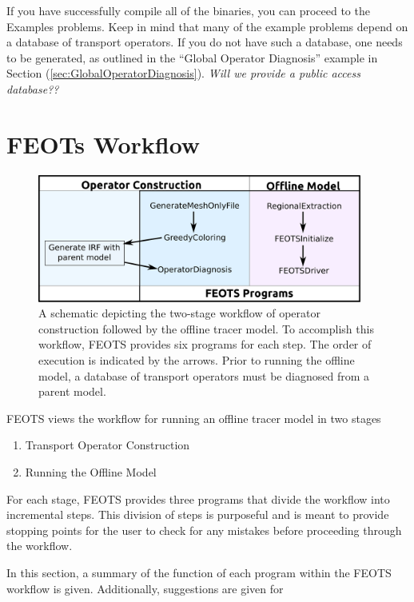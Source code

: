 \documentclass{softwaremanual}
\begin{document}
If you have successfully compile all of the binaries, you can proceed to the Examples problems. Keep in mind that many of the example problems depend on a database of transport operators. If you do not have such a database, one needs to be generated, as outlined in the ``Global Operator Diagnosis'' example in Section (\ref{sec:GlobalOperatorDiagnosis}). \textit{Will we provide a public access database??}

\chapter{FEOTs Workflow}
\begin{figure}[h!]
\begin{center}
\includegraphics[width=0.95\textwidth]{workflow.eps}
\caption{A schematic depicting the two-stage workflow of operator construction followed by the offline tracer model. To accomplish this workflow, FEOTS provides six programs for each step. The order of execution is indicated by the arrows. Prior to running the offline model, a database of transport operators must be diagnosed from a parent model. }\label{fig:workflow}
\end{center}
\end{figure}


FEOTS views the workflow for running an offline tracer model in two stages 
\begin{enumerate}
\item Transport Operator Construction

\item Running the Offline Model
\end{enumerate}

For each stage, FEOTS provides three programs that divide the workflow into incremental steps. This division of steps is purposeful and is meant to provide stopping points for the user to check for any mistakes before proceeding through the workflow.

In this section, a summary of the function of each program within the FEOTS workflow is given. Additionally, suggestions are given for 
\end{document}
